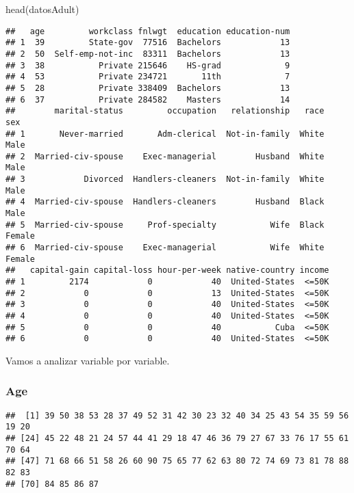 \documentclass[]{article}
\newenvironment{Shaded}{\begin{snugshade}}{\end{snugshade}}
\newcommand{\KeywordTok}[1]{\textcolor[rgb]{0.94,0.87,0.69}{#1}}
\newcommand{\NormalTok}[1]{\textcolor[rgb]{0.80,0.80,0.80}{#1}}
\newcommand{\OperatorTok}[1]{\textcolor[rgb]{0.94,0.94,0.82}{#1}}
\begin{document}
\begin{Shaded}
\begin{Highlighting}[]
\KeywordTok{head}\NormalTok{(datosAdult)}
\end{Highlighting}
\end{Shaded}

\begin{verbatim}
##   age         workclass fnlwgt  education education-num
## 1  39         State-gov  77516  Bachelors            13
## 2  50  Self-emp-not-inc  83311  Bachelors            13
## 3  38           Private 215646    HS-grad             9
## 4  53           Private 234721       11th             7
## 5  28           Private 338409  Bachelors            13
## 6  37           Private 284582    Masters            14
##        marital-status         occupation   relationship   race     sex
## 1       Never-married       Adm-clerical  Not-in-family  White    Male
## 2  Married-civ-spouse    Exec-managerial        Husband  White    Male
## 3            Divorced  Handlers-cleaners  Not-in-family  White    Male
## 4  Married-civ-spouse  Handlers-cleaners        Husband  Black    Male
## 5  Married-civ-spouse     Prof-specialty           Wife  Black  Female
## 6  Married-civ-spouse    Exec-managerial           Wife  White  Female
##   capital-gain capital-loss hour-per-week native-country income
## 1         2174            0            40  United-States  <=50K
## 2            0            0            13  United-States  <=50K
## 3            0            0            40  United-States  <=50K
## 4            0            0            40  United-States  <=50K
## 5            0            0            40           Cuba  <=50K
## 6            0            0            40  United-States  <=50K
\end{verbatim}

Vamos a analizar variable por variable.

\hypertarget{age}{%
\subsubsection{Age}\label{age}}

\begin{Shaded}
\end{Shaded}

\begin{verbatim}
##  [1] 39 50 38 53 28 37 49 52 31 42 30 23 32 40 34 25 43 54 35 59 56 19 20
## [24] 45 22 48 21 24 57 44 41 29 18 47 46 36 79 27 67 33 76 17 55 61 70 64
## [47] 71 68 66 51 58 26 60 90 75 65 77 62 63 80 72 74 69 73 81 78 88 82 83
## [70] 84 85 86 87
\end{verbatim}
\end{document}
